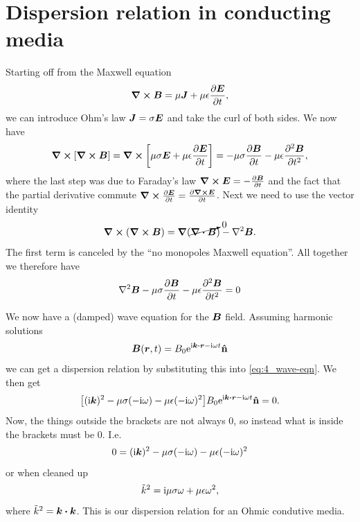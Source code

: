 \documentclass[11pt,letter, swedish, english
]{article}
\begin{document}
\section{Dispersion relation in conducting media}
Starting off from the Maxwell equation
\begin{equation}
\curl\vb*B = \mu\vb*J + \mu\epsilon\pdv{\vb*E}{t},
\end{equation}
we can introduce Ohm's law $\vb*J=\sigma\vb*E$ and take the curl of
both sides. We now have
\begin{equation}\label{eq:4_wave-eqn}
\curl[\curl\vb*B] = 
\curl\qty[\mu\sigma\vb*E + \mu\epsilon\pdv{\vb*E}{t}]
=-\mu\sigma\pdv{\vb*B}{t} - \mu\epsilon\pdv[2]{\vb*B}{t},
\end{equation}
where the last step was due to Faraday's law 
$\curl\vb*E = -\pdv{\vb*B}{t}$ and the fact that the partial
derivative commute $\curl\pdv{\vb*E}{t} = \pdv{\curl\vb*E}{t}$. 
Next we need to use the vector identity
\begin{equation}
\curl(\curl\vb*B) = \grad{}(\cancelto{0}{\div\vb*B}) - \laplacian\vb*B.
\end{equation}
The first term is canceled by the ``no monopoles Maxwell
equation''. All together we therefore have
\begin{equation}\label{eq:4_wave-eqn}
\laplacian\vb*B
-\mu\sigma\pdv{\vb*B}{t} - \mu\epsilon\pdv[2]{\vb*B}{t} =0
\end{equation}

We now have a (damped) wave equation for the $\vb*B$ field. Assuming
harmonic solutions
\begin{equation}
\vb*B(\vb*r, t) = B_0\ee^{\ii\vb*k\vdot\vb*r - \ii\omega t}\vu{n}
\end{equation}
we can get a dispersion relation by substituting this into
\eqref{eq:4_wave-eqn}. We then get
\begin{equation}
\qty[(\ii\vb*k)^2
-\mu\sigma(-\ii\omega) - \mu\epsilon(-\ii\omega)^2
]B_0\ee^{\ii\vb*k\vdot\vb*r - \ii\omega t}\vu{n} =0.
\end{equation}
Now, the things outside the brackets are not always 0, so instead what
is inside the brackets must be 0. I.e.
\begin{equation}
0=(\mathrm{i}\vb*k)^2
-\mu\sigma(-\mathrm{i}\omega) - \mu\epsilon(-\mathrm{i}\omega)^2
\end{equation}
or when cleaned up
\begin{equation}\label{eq:4_disp}
\tilde{k}^2 = \mathrm{i}\mu\sigma\omega +\mu\epsilon\omega^2,
\end{equation}
where $\kt^2 = \vb*k\vdot\vb*k$.
This is our dispersion relation for an Ohmic condutive media. 
\end{document}
